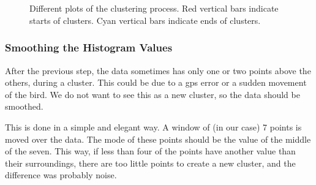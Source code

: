 \begin{figure}
  \centering
   \\
   \\
  \caption{Different plots of the clustering process. Red vertical bars indicate starts of clusters. Cyan vertical bars indicate ends of clusters.}
  \label{fig:clustering}
\end{figure}


\subsubsection{Smoothing the Histogram Values}
After the previous step, the data sometimes has only one or two points above the
others, during a cluster. This could be due to a gps error or a sudden movement
of the bird. We do not want to see this as a new cluster, so the data should be
smoothed.

This is done in a simple and elegant way. A window of (in our case) 7 points is
moved over the data. The mode of these points should be the value of the middle
of the seven. This way, if less than four of the points have another value than
their surroundings, there are too little points to create a new cluster, and the
difference was probably noise. 
